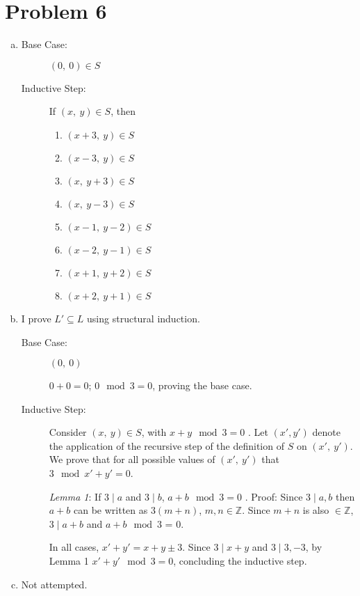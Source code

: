\documentclass[11pt]{article}
\begin{document}
\section*{Problem 6}
	\begin{enumerate}[(a)]
		\item \begin{description}
		
		\item[Base Case:] $(0,\ 0) \in S$
		
		\item[Inductive Step:] If $(x,\ y) \in S$, then
		
		\begin{enumerate}[i]
			\item $(x + 3,\ y) \in S$
			\item $(x-3,\ y) \in S$
			\item $(x,\ y + 3) \in S$
			\item $(x,\ y-3) \in S$
			\item $(x -1,\ y-2) \in S$
			\item $(x -2,\ y-1) \in S$
			\item $(x +1,\ y+2) \in S$
			\item $(x +2,\ y+1) \in S$
		\end{enumerate}		
		\end{description}	
	
		\item  I prove $L' \subseteq L$ using structural induction.
		
		\begin{description}
		\item[Base Case:] $(0,\ 0)$
		
		$0 + 0 = 0$; $0\mod 3 = 0$, proving the base case.
		
		\item[Inductive Step:] Consider $(x,\ y) \in S$, with $x + y \mod 3 = 0$
		. Let $(x', y')$ denote the application of the recursive step of the
		definition of $S$ on $(x',\ y')$. We prove that for all possible values 
		of $(x',\ y')$ that $3 \mod x' + y' = 0$.
		

		\textit{Lemma 1}: If $3 \mid a$ and $3 \mid b$, $a + b \mod 3 = 0$	. 
		Proof: Since
		$3 \mid a, b$ then $a + b$ can be written as $3( m + n)$, $m,n \in 
		\mathbb{Z}$. Since $m+n$ is also $\in \mathbb{Z}$, $3 \mid a+ b$ and
		$a+b \mod 3$ = 0.
		
		
		In all cases, $x' + y' = x + y \pm 3$. Since $3 \mid x+y$
		and $3 \mid 3, -3$, by Lemma 1 $x' + y' \mod 3 = 0$, concluding the
		inductive step.
		
		\end{description}
		
		
		\item Not attempted.
		
	
	
	\end{enumerate}
\end{document}

